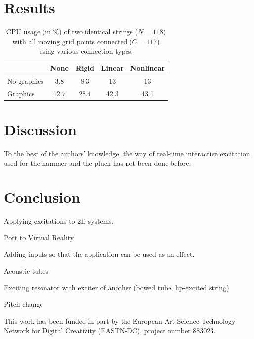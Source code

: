 \documentclass{article}
\begin{document}
\section{Results}

\begin{table}[]
    \centering
    \begin{tabular}{|l|c|c|c|c|}
        \hline  & None & Rigid & Linear & Nonlinear \\\hline
        No graphics & 3.8 & 8.3 & 13 & 13\\
        Graphics & 12.7 & 28.4 & 42.3 & 43.1\\\hline
    \end{tabular}
    \caption{CPU usage (in \%) of two identical strings ($N=118$) with all moving grid points connected ($C = 117$) using various connection types.}
    \label{tab:CPU}
\end{table}

\section{Discussion}
To the best of the authors' knowledge, the way of real-time interactive excitation used for the hammer and the pluck has not been done before. 


\section{Conclusion}

Applying excitations to 2D systems.

Port to Virtual Reality

Adding inputs so that the application can be used as an effect. 

Acoustic tubes

Exciting resonator with exciter of another (bowed tube, lip-excited string)

Pitch change


\begin{acknowledgments}
This work has been funded in part by the European Art-Science-Technology Network for Digital Creativity (EASTN-DC), project number 883023.
\end{acknowledgments} 


\end{document}
